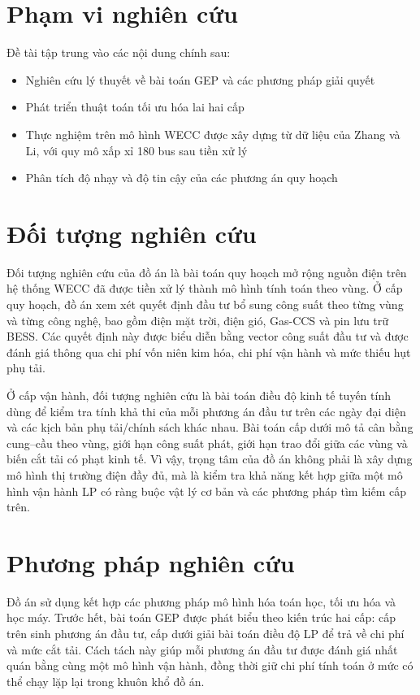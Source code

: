 \section{Phạm vi nghiên cứu}

Đề tài tập trung vào các nội dung chính sau:

\begin{itemize}
    \item Nghiên cứu lý thuyết về bài toán GEP và các phương pháp giải quyết \cite{koltsaklis2018gep,sadeghi2017gep_review}
    \item Phát triển thuật toán tối ưu hóa lai hai cấp
    \item Thực nghiệm trên mô hình WECC được xây dựng từ dữ liệu của Zhang và Li, với quy mô xấp xỉ 180 bus sau tiền xử lý \cite{zhang2023dataset}
    \item Phân tích độ nhạy và độ tin cậy của các phương án quy hoạch
\end{itemize}

\section{Đối tượng nghiên cứu}

Đối tượng nghiên cứu của đồ án là bài toán quy hoạch mở rộng nguồn điện trên hệ thống WECC đã được tiền xử lý thành mô hình tính toán theo vùng. Ở cấp quy hoạch, đồ án xem xét quyết định đầu tư bổ sung công suất theo từng vùng và từng công nghệ, bao gồm điện mặt trời, điện gió, Gas-CCS và pin lưu trữ BESS. Các quyết định này được biểu diễn bằng vector công suất đầu tư và được đánh giá thông qua chi phí vốn niên kim hóa, chi phí vận hành và mức thiếu hụt phụ tải.

Ở cấp vận hành, đối tượng nghiên cứu là bài toán điều độ kinh tế tuyến tính dùng để kiểm tra tính khả thi của mỗi phương án đầu tư trên các ngày đại diện và các kịch bản phụ tải/chính sách khác nhau. Bài toán cấp dưới mô tả cân bằng cung--cầu theo vùng, giới hạn công suất phát, giới hạn trao đổi giữa các vùng và biến cắt tải có phạt kinh tế. Vì vậy, trọng tâm của đồ án không phải là xây dựng mô hình thị trường điện đầy đủ, mà là kiểm tra khả năng kết hợp giữa một mô hình vận hành LP có ràng buộc vật lý cơ bản và các phương pháp tìm kiếm cấp trên.

\section{Phương pháp nghiên cứu}

Đồ án sử dụng kết hợp các phương pháp mô hình hóa toán học, tối ưu hóa và học máy. Trước hết, bài toán GEP được phát biểu theo kiến trúc hai cấp: cấp trên sinh phương án đầu tư, cấp dưới giải bài toán điều độ LP để trả về chi phí và mức cắt tải. Cách tách này giúp mỗi phương án đầu tư được đánh giá nhất quán bằng cùng một mô hình vận hành, đồng thời giữ chi phí tính toán ở mức có thể chạy lặp lại trong khuôn khổ đồ án.

